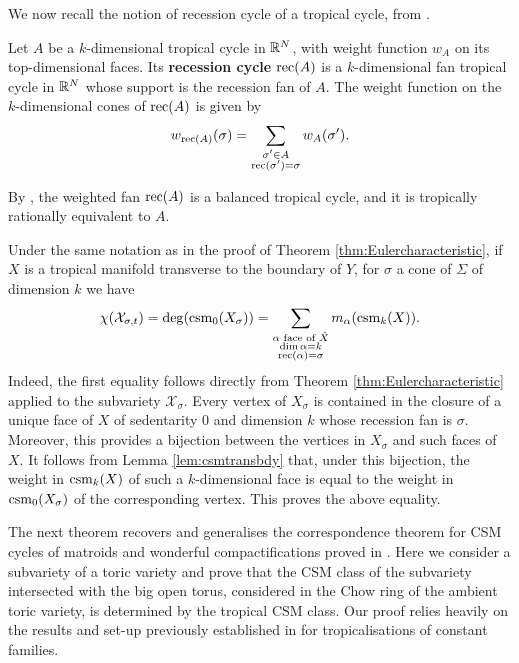  
 We now recall the notion of recession cycle of a tropical cycle, from \cite[Section 5]{AHR}. 
 
 \begin{defi}\label{def:reccycle}
 Let $A$ be a $k$-dimensional tropical cycle in $\mathbb{R}^N$, with weight function $w_A$ on its top-dimensional faces. Its {\bf recession cycle} $\operatorname{rec}(A)$ is a $k$-dimensional fan tropical cycle in $\mathbb{R}^N$ whose support is the recession fan of $A$. The weight function on the $k$-dimensional cones of $\operatorname{rec}(A)$ is given by
 \begin{equation}\label{recweight}
 w_{\operatorname{rec}(A)}(\sigma) = \sum_{\substack{ \sigma' \in A \\ \operatorname{rec}(\sigma')  = \sigma}} w_A(\sigma').
 \end{equation}
 \end{defi} 
 By \cite[Theorem 5.3]{AHR}, the weighted fan $\operatorname{rec}(A)$ is a balanced tropical cycle, and it is tropically rationally equivalent to $A$.

 \begin{rem}\label{rem:EulerChar}
 Under the same notation as in the proof of Theorem \ref{thm:Eulercharacteristic}, if $X$ is a tropical manifold transverse to the boundary of $Y$, for $\sigma $ a cone of $\Sigma$ of dimension $k$ we have
  $$\chi( \mathcal{X}_{\sigma,t}) = \deg(\operatorname{csm}_0(X_{\sigma})) = \sum_{\substack{\alpha \text{ face of } \hat X \\ \dim \alpha = k \\ \operatorname{rec}(\alpha)  = \sigma} } m_{\alpha}(\operatorname{csm}_k(X)).$$
 Indeed, the first equality follows directly from Theorem \ref{thm:Eulercharacteristic} applied to the subvariety $\mathcal{X}_{\sigma}$. 
 Every vertex of $X_{\sigma}$ is contained in the closure of a unique face of $X$ of sedentarity $0$ and dimension $k$ whose recession fan is $\sigma$. 
Moreover, this provides a  bijection between the vertices in $X_{\sigma}$ and such faces of $X$.  
It follows from Lemma \ref{lem:csmtransbdy} that, under this bijection, the weight in $\operatorname{csm}_k(X)$ of  such a $k$-dimensional face is equal to the weight in $\operatorname{csm}_0(X_{\sigma})$ of the corresponding vertex. This proves the above equality. 
 \end{rem}

 


The next theorem recovers and generalises the correspondence theorem for CSM cycles of matroids and wonderful compactifications proved in  \cite[Theorem 3.1]{LdMRS}. 
Here we consider a subvariety of a toric variety and prove that the CSM class of the subvariety intersected with the big open torus, considered in the Chow ring of the ambient toric variety, is determined by the tropical CSM class. 
Our proof relies heavily on the results and set-up previously established in \cite{Esterov} for tropicalisations of constant families. 


